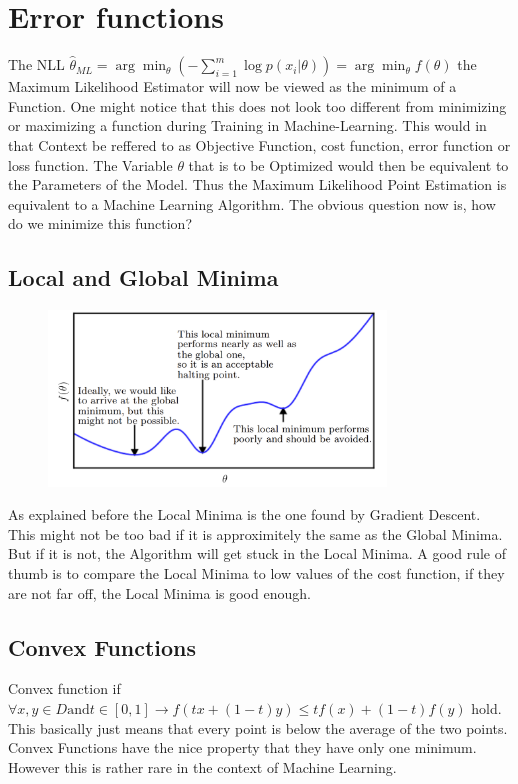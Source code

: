 \documentclass[a4paper]{article}
\begin{document}
\section{Error functions}
The NLL  $\hat{\theta}_{ML} =  \arg\min_{\theta} (- \sum_{i = 1}^{m} \log p(x_{i}|\theta)) = \arg \min_{\theta} f(\theta)$ the Maximum Likelihood Estimator will now be viewed as the minimum of a Function. One might notice that this does not look too different from minimizing or maximizing a function during Training in Machine-Learning. This would in that Context be reffered to as  Objective Function, cost function, error function or loss function. The Variable $\theta$ that is to be Optimized would then be equivalent to the Parameters of the Model. Thus the Maximum Likelihood Point Estimation is equivalent to a Machine Learning Algorithm. 
The obvious question now is, how do we minimize this function?



\subsection{Local and Global Minima}
\begin{figure}[h]
    \centering
    \includegraphics[width=0.8\textwidth]{images/local_global.png}
    \caption{}
    \label{fig:Local vs Global Minima}
\end{figure}
As explained before the Local Minima is the one found by Gradient Descent. This might not be too bad if it is approximitely the same as the Global Minima. But if it is not, the Algorithm will get stuck in the Local Minima. A good rule of thumb is to compare the Local Minima to low values of the cost function, if they are not far off, the Local Minima is good enough.

\newpage
\subsection{Convex Functions}
Convex function if $\forall x,y \in D  \text{and} t \in [0,1] \rightarrow f(tx + (1-t)y) \leq tf(x) + (1-t)f(y)$ hold. This basically just means that every point is below the average of the two points. Convex Functions have the nice property that they have only one minimum. However this is rather rare in the context of Machine Learning.
\end{document}
